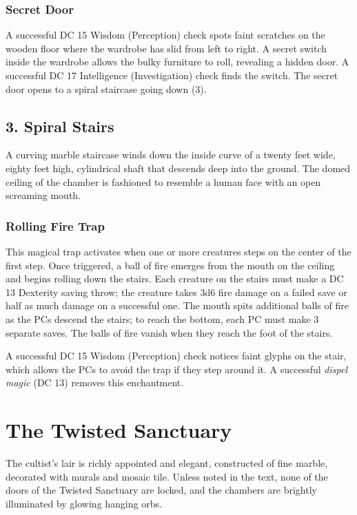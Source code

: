 \documentclass[10pt,a4paper,twoside,bg=print,twocolumn,openany,nodeprecatedcode]{dndbook}
\begin{document}
\subsubsection{Secret Door}
A successful DC 15 Wisdom (Perception) check spots faint scratches on the wooden floor where the wardrobe has slid from left to right. A secret switch inside the wardrobe allows the bulky furniture to roll, revealing a hidden door. A successful DC 17 Intelligence (Investigation) check finds the switch. The secret door opens to a spiral staircase going down (3).

\subsection{3. Spiral Stairs}
\begin{DndReadAloud}{}
A curving marble staircase winds down the inside curve of a twenty feet wide, eighty feet high, cylindrical shaft that descends deep into the ground. The domed ceiling of the chamber is fashioned to resemble a human face with an open screaming mouth.

\end{DndReadAloud}

\subsubsection{Rolling Fire Trap}
This magical trap activates when one or more creatures steps on the center of the first step. Once triggered, a ball of fire emerges from the mouth on the ceiling and begins rolling down the stairs. Each creature on the stairs must make a DC 13 Dexterity saving throw; the creature takes 3d6 fire damage on a failed save or half as much damage on a successful one. The mouth spits additional balls of fire as the PCs descend the stairs; to reach the bottom, each PC must make 3 separate saves. The balls of fire vanish when they reach the foot of the stairs.

A successful DC 15 Wisdom (Perception) check notices faint glyphs on the stair, which allows the PCs to avoid the trap if they step around it. A successful \textit{dispel magic} (DC 13) removes this enchantment.

\section{The Twisted Sanctuary}
The cultist's lair is richly appointed and elegant, constructed of fine marble, decorated with murals and mosaic tile. Unless noted in the text, none of the doors of the Twisted Sanctuary are locked, and the chambers are brightly illuminated by glowing hanging orbs.
\end{document}
